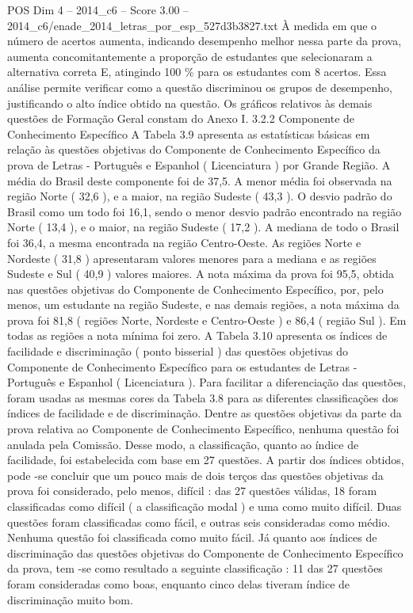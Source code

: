 \begin{textsample}{POS Dim 4 – 2014\_c6 – Score 3.00 – 2014\_c6/enade\_2014\_letras\_por\_esp\_527d3b3827.txt}
À medida em que o número de acertos aumenta, indicando desempenho melhor nessa parte da prova, aumenta concomitantemente a proporção de estudantes que selecionaram a alternativa correta E, atingindo 100 \% para os estudantes com 8 acertos.
Essa análise permite verificar como a questão discriminou os grupos de desempenho, justificando o alto índice obtido na questão.
Os gráficos relativos às demais questões de Formação Geral constam do Anexo I. 3.2.2 Componente de Conhecimento Específico A Tabela 3.9 apresenta as estatísticas básicas em relação às questões objetivas do Componente de Conhecimento Específico da prova de Letras - Português e Espanhol ( Licenciatura ) por Grande Região.
A média do Brasil deste componente foi de 37,5.
A menor média foi observada na região Norte ( 32,6 ), e a maior, na região Sudeste ( 43,3 ).
O desvio padrão do Brasil como um todo foi 16,1, sendo o menor desvio padrão encontrado na região Norte ( 13,4 ), e o maior, na região Sudeste ( 17,2 ).
A mediana de todo o Brasil foi 36,4, a mesma encontrada na região Centro-Oeste.
As regiões Norte e Nordeste ( 31,8 ) apresentaram valores menores para a mediana e as regiões Sudeste e Sul ( 40,9 ) valores maiores.
A nota máxima da prova foi 95,5, obtida nas questões objetivas do Componente de Conhecimento Específico, por, pelo menos, um estudante na região Sudeste, e nas demais regiões, a nota máxima da prova foi 81,8 ( regiões Norte, Nordeste e Centro-Oeste ) e 86,4 ( região Sul ).
Em todas as regiões a nota mínima foi zero.
A Tabela 3.10 apresenta os índices de facilidade e discriminação ( ponto bisserial ) das questões objetivas do Componente de Conhecimento Específico para os estudantes de Letras - Português e Espanhol ( Licenciatura ).
Para facilitar a diferenciação das questões, foram usadas as mesmas cores da Tabela 3.8 para as diferentes classificações dos índices de facilidade e de discriminação.
Dentre as questões objetivas da parte da prova relativa ao Componente de Conhecimento Específico, nenhuma questão foi anulada pela Comissão.
Desse modo, a classificação, quanto ao índice de facilidade, foi estabelecida com base em 27 questões.
A partir dos índices obtidos, pode -se concluir que um pouco mais de dois terços das questões objetivas da prova foi considerado, pelo menos, difícil : das 27 questões válidas, 18 foram classificadas como difícil ( a classificação modal ) e uma como muito difícil.
Duas questões foram classificadas como fácil, e outras seis consideradas como médio.
Nenhuma questão foi classificada como muito fácil.
Já quanto aos índices de discriminação das questões objetivas do Componente de Conhecimento Específico da prova, tem -se como resultado a seguinte classificação : 11 das 27 questões foram consideradas como boas, enquanto cinco delas tiveram índice de discriminação muito bom.

\end{textsample}
